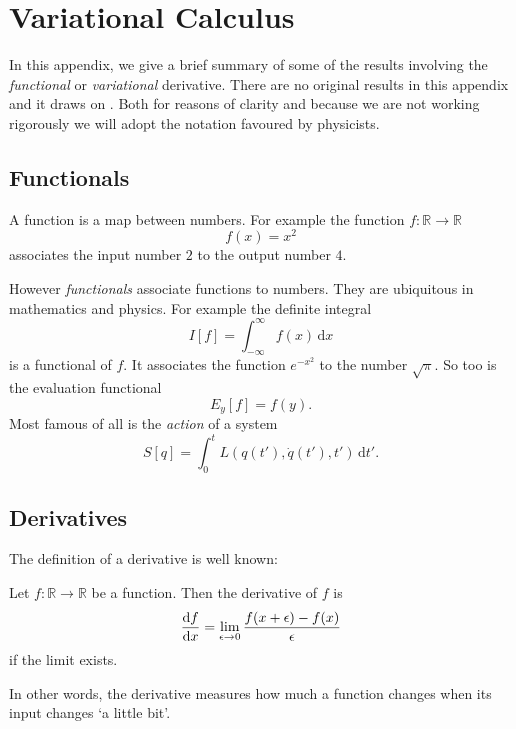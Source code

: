 \chapter{Variational Calculus}
\label{appendix:variational_calculus}

In this appendix, we give a brief summary of some of the results involving the \emph{functional} or \emph{variational} derivative.
There are no original results in this appendix and it draws on \cite{Lancaster2014,goldenfeld1992}. Both for reasons of clarity and because we are not
working rigorously we will adopt the notation favoured by physicists.

\section{Functionals}
A function is a map between numbers. For example the function $f\colon \mathbb{R} \rightarrow \mathbb{R}$
\begin{equation}
  \label{eq:example_function}
  f(x) = x^2
\end{equation}
associates the input number $2$ to the output number $4$.

However \emph{functionals} associate functions to numbers. They are ubiquitous in mathematics and physics. For example
the definite integral
\begin{equation}
  \label{eq:example_functional_definite_integral}
  I[f] = \int_{-\infty}^{\infty} f(x) \, \mathrm{d}x
\end{equation}
is a functional of $f$. It associates the function $e^{-x^2}$ to the number $\sqrt{\pi}$.
So too is the evaluation functional
\begin{equation}
  \label{eq:example_functional_evaluation}
  E_y[f] = f(y).
\end{equation}
Most famous of all is the \emph{action} of a system
\begin{equation}
  \label{eq:example_functional_action}
  S[q] = \int_0^t L(q(t'),\dot{q}(t'),t')\,\mathrm{d}t'.
\end{equation}

\section{Derivatives}
The definition of a derivative is well known:
\begin{definition}
  \label{definition:derivative}
  Let $f\colon \mathbb{R} \rightarrow \mathbb{R}$ be a function. Then the derivative of $f$ is
  \begin{equation}
    \label{eq:definition_of_derivative}
    \dv{f}{x} = \lim_{\epsilon\rightarrow 0} \frac{f(x + \epsilon) - f(x)}{\epsilon}
  \end{equation}
  if the limit exists.
\end{definition}
In other words, the derivative measures how much a function changes when its input changes `a little bit'.

